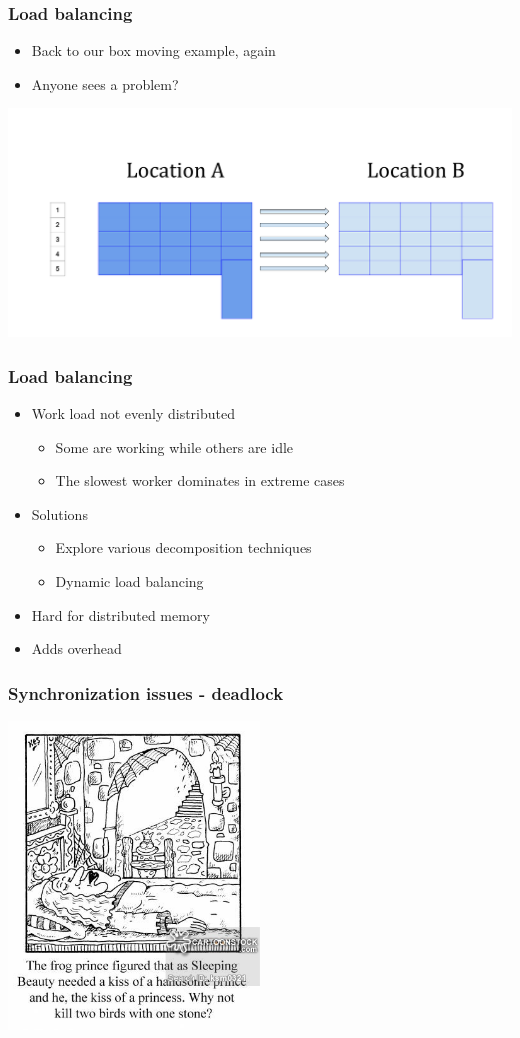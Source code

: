 \documentclass[10pt,t]{beamer}
\begin{document}
\begin{frame}
\frametitle{Load balancing}
\begin{itemize}
\item Back to our box moving example, again
\item Anyone sees a problem?
\end{itemize}
\includegraphics[width=\textwidth]{./Load-Balance}
\end{frame}

\begin{frame}
\frametitle{Load balancing}
\begin{itemize}
\item Work load not evenly distributed
\begin{itemize}
\item Some are working while others are idle
\item The slowest worker dominates in extreme cases
\end{itemize}
\item Solutions
\begin{itemize}
\item Explore various decomposition techniques
\item Dynamic load balancing
\end{itemize}
\item Hard for distributed memory
\item Adds overhead
\end{itemize}
\end{frame}

\begin{frame}
\frametitle{Synchronization issues - deadlock}
\begin{center}
\includegraphics[width=0.5\textwidth]{./SBFP}
\end{center}
\end{frame}
\end{document}
